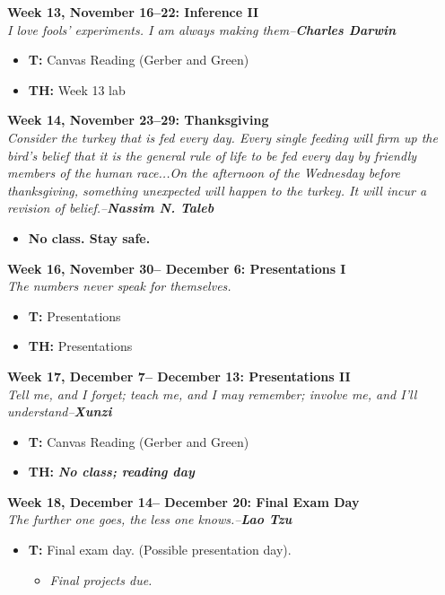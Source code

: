 \documentclass[11pt]{article}
\begin{document}
\textbf{Week 13, November 16--22: Inference II}
\\
\textit{I love fools' experiments. I am always making them--\textbf{Charles Darwin}}
\begin{itemize}
\item \textbf{T:} Canvas Reading (Gerber and Green) 
\item \textbf{TH:} Week 13 lab
\end{itemize}
\vspace{1em}
\textbf{Week 14, November 23--29: Thanksgiving}
\\
\textit{Consider the turkey that is fed every day. Every single feeding will firm up the bird's belief that it is the general rule of life to be fed every day by friendly members of the human race...On the afternoon of the Wednesday before thanksgiving, something \textit{unexpected} will happen to the turkey. It will incur a revision of belief.--\textbf{Nassim N. Taleb}}
\begin{itemize}
\item \textbf{No class. Stay safe.}
\end{itemize}
\vspace{1em}
\textbf{Week 16, November 30-- December 6: Presentations I}
\\
\textit{The numbers never speak for themselves.}
\begin{itemize}
\item \textbf{T:} Presentations 
\item \textbf{TH:} Presentations
\end{itemize}
\vspace{1em}
\textbf{Week 17, December 7-- December 13: Presentations II}
\\
\textit{Tell me, and I forget; teach me, and I may remember; involve me, and I'll understand--\textbf{Xunzi}}
\begin{itemize}
\item \textbf{T:} Canvas Reading (Gerber and Green) 
\item \textbf{TH:} \textit{\textbf{No class; reading day}}
\end{itemize}
\vspace{1em}
\textbf{Week 18, December 14-- December 20: Final Exam Day}
\\
\textit{The further one goes, the less one knows.--\textbf{Lao Tzu}}
\begin{itemize}
\item \textbf{T:} Final exam day. (Possible presentation day).
\begin{itemize}
\item \textit{Final projects due.}
\end{itemize}
\end{itemize}
\end{document}
